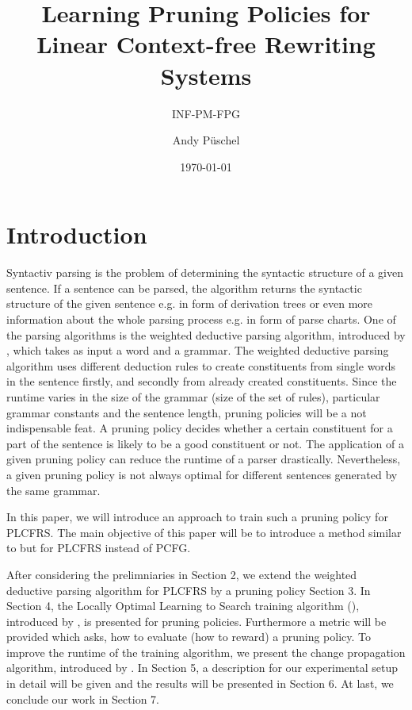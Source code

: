 \documentclass{tudscrartcl}
\title{Learning Pruning Policies for Linear Context-free Rewriting Systems}
\subtitle{INF-PM-FPG}
\author{Andy Püschel}
\date{\today}
\institute{Theoretical Computer Science}
\theoremstyle{definition}
\begin{document}
\maketitle


\section{Introduction}

Syntactiv parsing is the problem of determining the syntactic structure of a given sentence.
If a sentence can be parsed, the algorithm returns the syntactic structure of the given sentence e.g. in form of derivation trees or even more information about the whole parsing process e.g. in form of parse charts.
One of the parsing algorithms is the weighted deductive parsing algorithm, introduced by \cite{nederhof03}, which takes as input a word and a grammar. 
The weighted deductive parsing algorithm uses different deduction rules to create constituents from single words in the sentence firstly, and secondly from already created constituents. 
Since the runtime varies in the size of the grammar (size of the set of rules), particular grammar constants and the sentence length, pruning policies will be a not indispensable feat. 
A pruning policy decides whether a certain constituent for a part of the sentence is likely to be a good constituent or not.
The application of a given pruning policy can reduce the runtime of a parser drastically.
Nevertheless, a given pruning policy is not always optimal for different sentences generated by the same grammar.

In this paper, we will introduce an approach to train such a pruning policy for PLCFRS.
The main objective of this paper will be to introduce a method similar to \cite{vieira17} but for PLCFRS instead of PCFG.

After considering the prelimniaries in Section 2, we extend the weighted deductive parsing algorithm for PLCFRS by a pruning policy Section 3. In Section 4, the Locally Optimal Learning to Search training algorithm (), introduced by \cite{chang15}, is presented for pruning policies. Furthermore a metric will be provided which asks, how to evaluate (how to reward) a pruning policy. To improve the runtime of the training algorithm, we present the change propagation algorithm, introduced by \cite{vieira17}.
In Section 5, a description for our experimental setup in detail will be given and the results will be presented in Section 6.
At last, we conclude our work in Section 7.
\end{document}
